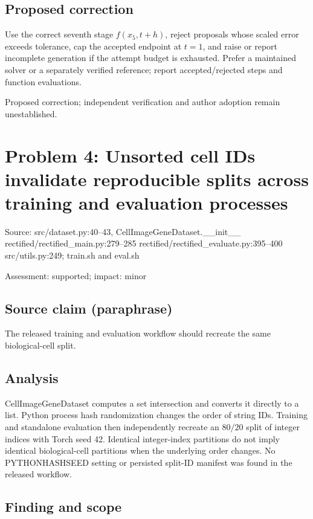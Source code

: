 \documentclass[11pt]{article}
\begin{document}
\subsection*{Proposed correction}

Use the correct seventh stage \(f(x_5,t+h)\), reject proposals whose scaled error exceeds tolerance, cap the accepted endpoint at \(t=1\), and raise or report incomplete generation if the attempt budget is exhausted. Prefer a maintained solver or a separately verified reference; report accepted/rejected steps and function evaluations.

Proposed correction; independent verification and author adoption remain unestablished.

\section*{Problem 4: Unsorted cell IDs invalidate reproducible splits across training and evaluation processes}

Source: src/dataset.py:40–43, CellImageGeneDataset.\_\_init\_\_ rectified/rectified\_main.py:279–285 rectified/rectified\_evaluate.py:395–400 src/utils.py:249; train.sh and eval.sh

Assessment: supported; impact: minor

\subsection*{Source claim (paraphrase)}

The released training and evaluation workflow should recreate the same biological-cell split.

\subsection*{Analysis}

CellImageGeneDataset computes a set intersection and converts it directly to a list. Python process hash randomization changes the order of string IDs. Training and standalone evaluation then independently recreate an \(80/20\) split of integer indices with Torch seed 42. Identical integer-index partitions do not imply identical biological-cell partitions when the underlying order changes. No PYTHONHASHSEED setting or persisted split-ID manifest was found in the released workflow.

\subsection*{Finding and scope}
\end{document}
